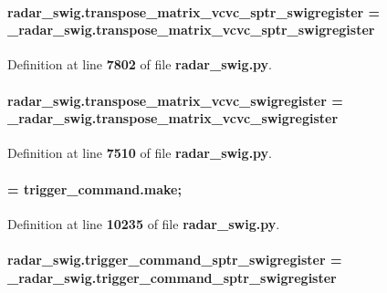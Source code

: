 \paragraph[{transpose\+\_\+matrix\+\_\+vcvc\+\_\+sptr\+\_\+swigregister}]{\setlength{\rightskip}{0pt plus 5cm}radar\+\_\+swig.\+transpose\+\_\+matrix\+\_\+vcvc\+\_\+sptr\+\_\+swigregister = \+\_\+radar\+\_\+swig.\+transpose\+\_\+matrix\+\_\+vcvc\+\_\+sptr\+\_\+swigregister}\label{namespaceradar__swig_a27381af34730695625b337fbcf8941d9}


Definition at line {\bf 7802} of file {\bf radar\+\_\+swig.\+py}.

\paragraph[{transpose\+\_\+matrix\+\_\+vcvc\+\_\+swigregister}]{\setlength{\rightskip}{0pt plus 5cm}radar\+\_\+swig.\+transpose\+\_\+matrix\+\_\+vcvc\+\_\+swigregister = \+\_\+radar\+\_\+swig.\+transpose\+\_\+matrix\+\_\+vcvc\+\_\+swigregister}\label{namespaceradar__swig_a43503a06f216ec28bfc27529815a5572}


Definition at line {\bf 7510} of file {\bf radar\+\_\+swig.\+py}.

\paragraph[{trigger\+\_\+command}]{ = {\bf trigger\+\_\+command.\+make};}\label{namespaceradar__swig_aaa1ee6adf03d66394be8691b63c52cc1}


Definition at line {\bf 10235} of file {\bf radar\+\_\+swig.\+py}.

\paragraph[{trigger\+\_\+command\+\_\+sptr\+\_\+swigregister}]{\setlength{\rightskip}{0pt plus 5cm}radar\+\_\+swig.\+trigger\+\_\+command\+\_\+sptr\+\_\+swigregister = \+\_\+radar\+\_\+swig.\+trigger\+\_\+command\+\_\+sptr\+\_\+swigregister}\label{namespaceradar__swig_a1349874e886b54b19ed483b5d15fd64f}


